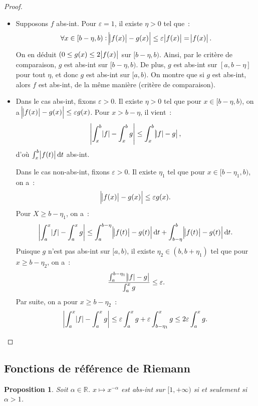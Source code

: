 \documentclass{report}
\newtheorem{prp}[thm]{Proposition}
\theoremstyle{definition}
\theoremstyle{remark}
\newcommand{\R}{\mathbb R}
\newcommand{\pinfty}{{+\infty}}
\begin{document}
			\begin{proof}~
			\begin{itemize}
				\item Supposons $f$ abs-int. Pour $\varepsilon = 1$, il existe $\eta > 0$ tel que~:
				\[\forall x \in [b - \eta, b) : \abs {\abs {f(x)} - g(x)} \leq \varepsilon \abs {f(x)} = \abs {f(x)}.\]
				On en déduit $(0 \leq g(x) \leq 2\abs {f(x)}$ sur $[b-\eta, b)$. Ainsi, par le critère de comparaison, $g$ est abs-int sur $[b-\eta, b)$. De plus,
				$g$ est abs-int sur $[a, b-\eta]$ pour tout $\eta$, et donc $g$ est abs-int sur $[a, b)$. On montre que si $g$ est abs-int, alors $f$ est abs-int, de la
				même manière (critère de comparaison).
				\item Dans le cas abs-int, fixons $\varepsilon > 0$. Il existe $\eta > 0$ tel que pour $x \in [b-\eta, b)$, on a
				$\abs {\abs {f(x)}-g(x)} \leq \varepsilon g(x)$. Pour $x > b-\eta$, il vient~:
				\[\abs {\int_x^b\abs f - \int_x^b g} \leq \int_x^b\abs {\abs f - g},\]
				d'où $\int_x^b\abs {f(t)}\dif t$ abs-int.

				Dans le cas non-abs-int, fixons $\varepsilon > 0$. Il existe $\eta_1$ tel que pour $x \in [b-\eta_1, b)$, on a~:
				\[\abs {\abs {f(x)} - g(x)} \leq \varepsilon g(x).\]
				Pour $X \geq b-\eta_1$, on a~:
				\[\abs {\int_a^x \abs f - \int_a^x g} \leq \int_a^{b- \eta}\abs {\abs {f(t)} - g(t)}\dif t + \int_{b-\eta}^b\abs {\abs {f(t)} - g(t)}\dif t.\]
				Puisque $g$ n'est pas abs-int sur $[a, b)$, il existe $\eta_2 \in (b, b+\eta_1)$ tel que pour $x \geq b-\eta_2$, on a~:
				\[\frac {\int_a^{b-\eta_1}\abs {\abs f - g}}{\int_a^x g} \leq \varepsilon.\]
				Par suite, on a pour $x \geq b - \eta_2$~:
				\[\abs {\int_a^x \abs f - \int_a^x g} \leq \varepsilon \int_a^xg + \varepsilon\int_{b-\eta_1}^x g \leq 2\varepsilon \int_a^x g.\]
			\end{itemize}
			\end{proof}

		\subsection{Fonctions de référence de Riemann}
			\begin{prp} Soit $\alpha \in \R$. $x \mapsto x^{-\alpha}$ est abs-int sur $[1, \pinfty)$ si et seulement si $\alpha > 1$.
			\end{prp}
\end{document}
